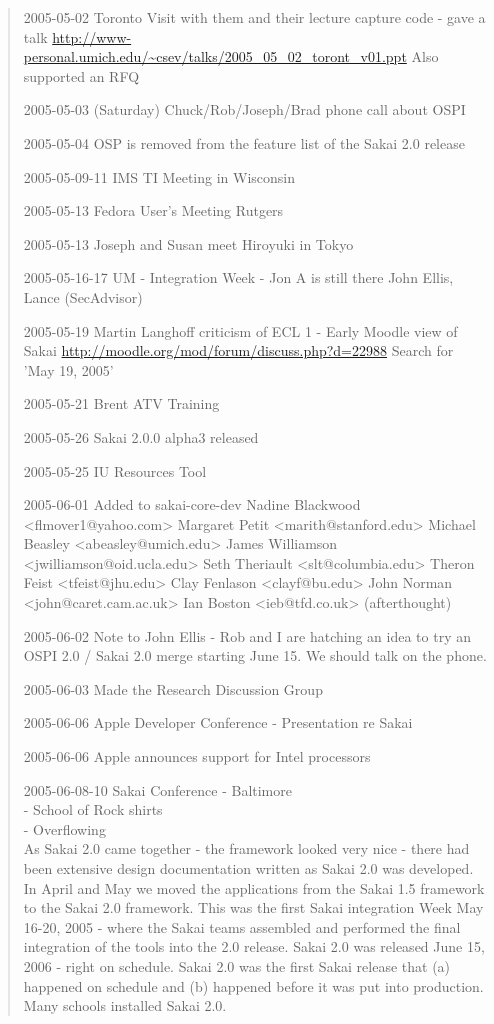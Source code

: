 \begin{quote}
2005-05-02 Toronto Visit with them and their lecture capture code - gave a talk 
\url{http://www-personal.umich.edu/~csev/talks/2005_05_02_toront_v01.ppt}
Also supported an RFQ

2005-05-03 (Saturday) Chuck/Rob/Joseph/Brad phone call about OSPI

2005-05-04 OSP is removed from the feature list of the Sakai 2.0 release

2005-05-09-11 IMS TI Meeting in Wisconsin 

2005-05-13 Fedora User's Meeting Rutgers

2005-05-13 Joseph and Susan meet Hiroyuki in Tokyo

2005-05-16-17 UM - Integration Week - Jon A is still there John Ellis, Lance (SecAdvisor)

2005-05-19 Martin Langhoff criticism of ECL 1 - Early Moodle view of Sakai
\url{http://moodle.org/mod/forum/discuss.php?d=22988} Search for 'May 19, 2005'

2005-05-21 Brent ATV Training

2005-05-26 Sakai 2.0.0 alpha3 released

2005-05-25 IU Resources Tool

2005-06-01 Added to sakai-core-dev Nadine Blackwood <flmover1@yahoo.com> Margaret Petit <marith@stanford.edu> Michael Beasley <abeasley@umich.edu> James Williamson <jwilliamson@oid.ucla.edu> Seth Theriault <slt@columbia.edu> Theron Feist <tfeist@jhu.edu> Clay Fenlason <clayf@bu.edu> John Norman <john@caret.cam.ac.uk> Ian Boston <ieb@tfd.co.uk> (afterthought)

2005-06-02 Note to John Ellis - Rob and I are hatching an idea to try an OSPI 2.0 / Sakai 2.0 merge starting June 15.  We should talk on the phone.

2005-06-03 Made the Research Discussion Group

2005-06-06 Apple Developer Conference - Presentation re Sakai

2005-06-06 Apple announces support for Intel processors

2005-06-08-10 Sakai Conference - Baltimore\\
- School of Rock shirts\\
- Overflowing\\

As Sakai 2.0 came together - the framework looked very nice - there had been extensive design documentation written as Sakai 2.0 was developed.  In April and May we moved the applications from the Sakai 1.5 framework to the Sakai 2.0 framework.  This was the first Sakai integration Week May 16-20, 2005 - where the Sakai teams assembled and performed the final integration of the tools into the 2.0 release.  Sakai 2.0 was released June 15, 2006 - right on schedule.  Sakai 2.0 was the first Sakai release that (a) happened on schedule and (b) happened before it was put into production.  Many schools installed Sakai 2.0.


\end{quote}
